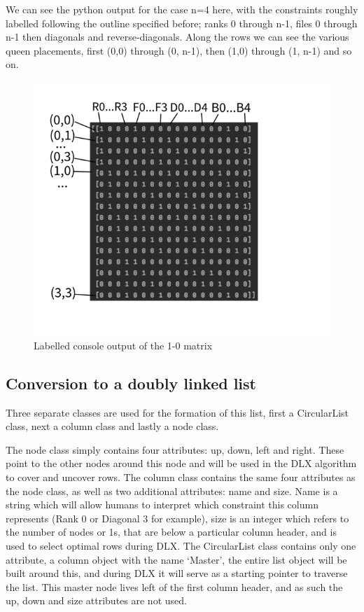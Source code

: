 \documentclass{article}
\begin{document}
We can see the python output for the case n=4 here, with the constraints roughly labelled following the outline specified before; ranks 0 through n-1, files 0 through n-1 then diagonals and reverse-diagonals. Along the rows we can see the various queen placements, first (0,0) through (0, n-1), then (1,0) through (1, n-1) and so on.

\begin{figure}[ht]
\centering
\includegraphics[scale=0.8]{images/chess3.png}
\caption{Labelled console output of the 1-0 matrix}
\label{fig: Labelled console output of the 1-0 matrix}
\end{figure}

\subsection{Conversion to a doubly linked list}
Three separate classes are used for the formation of this list, first a CircularList class, next a column class and lastly a node class.

The node class simply contains four attributes: up, down, left and right. These point to the other nodes around this node and will be used in the DLX algorithm to cover and uncover rows.
The column class contains the same four attributes as the node class, as well as two additional attributes: name and size. Name is a string which will allow humans to interpret which constraint this column represents (Rank 0 or Diagonal 3 for example), size is an integer which refers to the number of nodes or 1s, that are below a particular column header, and is used to select optimal rows during DLX.
The CircularList class contains only one attribute, a column object with the name ‘Master’, the entire list object will be built around this, and during DLX it will serve as a starting pointer to traverse the list. This master node lives left of the first column header, and as such the up, down and size attributes are not used.
\end{document}
